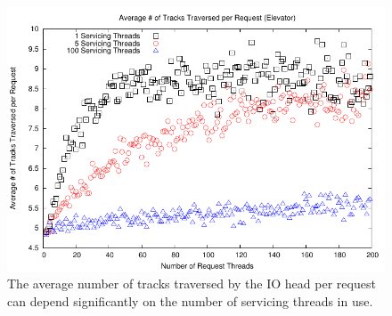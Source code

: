 \documentclass{report}
\begin{document}
\newpage
\begin{figure}[htb!]
    \centering
    \includegraphics[scale=1]{distanceElevator.pdf}
    \caption{The average number of tracks traversed by the IO head per request can depend
    significantly on the number of servicing threads in use.}
    \label{fig:distanceElevator}
\end{figure}
\end{document}
